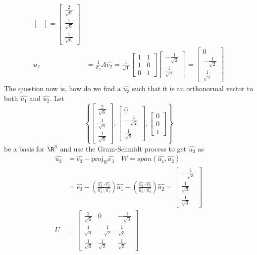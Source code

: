 \documentclass{math}
\begin{document}
\begin{align*}
\begin{bmatrix}
  \end{bmatrix} = \begin{bmatrix}
    \frac{2}{\sqrt{6}} \\ \frac{1}{\sqrt{6}} \\ \frac{1}{\sqrt{6}}
  \end{bmatrix} \\
  \hat{u_2} &= \frac{1}{\sigma_2}A\hat{v_2} = \frac{1}{\sqrt{1}}\begin{bmatrix}
    1 & 1 \\
    1 & 0 \\
    0 & 1
  \end{bmatrix}\begin{bmatrix}
    -\frac{1}{\sqrt{2}} \\ \frac{1}{\sqrt{2}}
  \end{bmatrix} = \begin{bmatrix}
    0 \\ -\frac{1}{\sqrt{2}} \\ \frac{1}{\sqrt{2}}
  \end{bmatrix}
\end{align*}
The question now is, how do we find a \( \hat{u_3} \) such that it is an
orthonormal vector to both \( \hat{u_1} \) and \( \hat{u_2} \). Let
\[ \left\{\begin{bmatrix}
  \frac{2}{\sqrt{6}} \\ \frac{1}{\sqrt{6}} \\ \frac{1}{\sqrt{6}}
\end{bmatrix},\begin{bmatrix}
  0 \\ -\frac{1}{\sqrt{2}} \\ \frac{1}{\sqrt{2}}
\end{bmatrix},\begin{bmatrix}
  0 \\ 0 \\ 1
\end{bmatrix}\right\} \]
be a basis for \( \R^3 \) and use the Gram-Schmidt process to get
\( \hat{u_3} \) as
\begin{align*}
  \hat{u_3} &= \hat{e_3}-\text{proj}_W\hat{e_3} \quad
    W = span(\hat{u_1},\hat{u_2}) \\
  &= \hat{e_3}-\left(\frac{\hat{u_1}\cdot\hat{e_3}}{\hat{u_1}\cdot\hat{u_1}}
    \right)\hat{u_1}-\left(\frac{\hat{u_2}\cdot\hat{e_3}}
    {\hat{u_2}\cdot\hat{u_2}}\right)\hat{u_2}
  = \begin{bmatrix}
    -\frac{1}{\sqrt{3}} \\ \frac{1}{\sqrt{3}} \\ \frac{1}{\sqrt{3}}
  \end{bmatrix} \\
  U &= \begin{bmatrix}
    \frac{2}{\sqrt{6}} & 0 & -\frac{1}{\sqrt{3}} \\
    \frac{1}{\sqrt{6}} & -\frac{1}{\sqrt{2}} & \frac{1}{\sqrt{3}} \\
    \frac{1}{\sqrt{6}} & \frac{1}{\sqrt{2}} & \frac{1}{\sqrt{3}}
  \end{bmatrix}
\end{align*}
\end{document}
